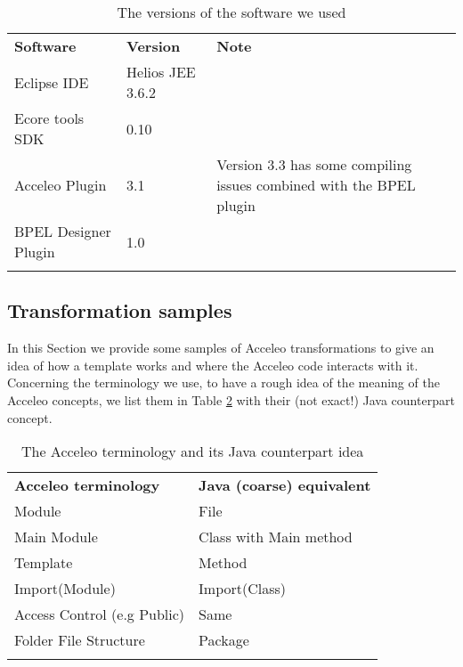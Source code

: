 \begin{table}
\caption{The versions of the software we used}
\label{tab:softwareVersions}
\begin{center}
\begin{tabular}{l l p{7cm}}
						\toprule
						\addlinespace[0.2cm]
\textbf{Software} 	& \textbf{Version} 	& \textbf{Note} 	\\ 
						\cmidrule(l){1-3}
Eclipse IDE 			& Helios JEE 3.6.2				& 	\\[0,1cm]		
Ecore tools SDK			& 0.10						&  	\\[0,1cm]
Acceleo Plugin			& 3.1						& Version 3.3 has some compiling issues combined with the BPEL plugin    	\\[0,1cm]
BPEL Designer Plugin 		& 1.0						&  	\\[0,1cm]

						\addlinespace[0.2cm]
						\bottomrule
\end{tabular}
\end{center}
\end{table}

\subsection{Transformation samples}
\label{sec:codeSamples}
In this Section we provide some samples of Acceleo transformations to give an idea of how a template works and where the Acceleo code interacts with it. 
Concerning the terminology we use, to have a rough idea of the meaning of the Acceleo concepts, we list them in Table \ref{tab:terminology} with their (not exact!) Java counterpart concept.
\begin{table}[h!]
\caption{The Acceleo terminology and its Java counterpart idea}
\label{tab:terminology}
\begin{center}
\begin{tabular}{p{6cm} l} %
						\toprule
						\addlinespace[0.2cm]
\textbf{Acceleo terminology} 	& \textbf{Java (coarse) equivalent} 	\\ 
						\cmidrule(l){1-2}
Module 				& File				 	\\[0,1cm]		
Main Module			& Class with Main method		\\[0,1cm]
Template			& Method			  	\\[0,1cm]
Import(Module)			& Import(Class)			    	\\[0,1cm]
Access Control (e.g Public)	& Same 					\\[0,1cm]
Folder File Structure		& Package				\\[0,1cm]

						\addlinespace[0.2cm]
						\bottomrule
\end{tabular}
\end{center}
\end{table}

